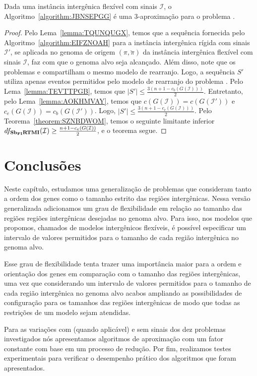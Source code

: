\begin{theorem}\label{theorem:AKZNNSGT}
Dada uma instância intergênica flexível com sinais $\mathcal{I}$, o Algoritmo~\ref{algorithm:JBNSEPGG} é uma $3$-aproximação para o problema \SbFIRTMI{}.
\end{theorem}
\begin{proof}
Pelo Lema~\ref{lemma:TQUNQUGX}, temos que a sequência fornecida pelo Algoritmo~\ref{algorithm:EIFZNOAH} para a instância intergênica rígida com sinais $\mathcal{I'}$, se aplicada no genoma de origem $(\pi,\breve\pi)$ da instância intergênica flexível com sinais $\mathcal{I}$, faz com que o genoma alvo seja alcançado. Além disso, note que os problemas \SbIRTMI{} e \SbFIRTMI{} compartilham o mesmo modelo de rearranjo. Logo, a sequência $S'$ utiliza apenas eventos permitidos pelo modelo de rearranjo do problema \SbFIRTMI{}. Pelo Lema~\ref{lemma:TEVTTPGB}, temos que $|S'| \le \frac{3(n+1 - c_b(G(\mathcal{I})))}{2}$. Entretanto, pelo Lema~\ref{lemma:AOKHMVAY}, temos que $c(G(\mathcal{I})) = c(G(\mathcal{I}'))$ e $c_e(G(\mathcal{I})) = c_b(G(\mathcal{I}'))$. Logo, $|S'| \le \frac{3(n+1 - c_e(G(\mathcal{I})))}{2}$. Pelo Teorema~\ref{theorem:SZNBDWOM}, temos o seguinte limitante inferior $df_{\textbf{Sb\textsubscript{FI}RTMI}}(\mathcal{I}) \ge \frac{n+1 - c_e(G(\mathcal{I}))}{2}$, e o teorema segue.
\end{proof}

\section{Conclusões}

Neste capítulo, estudamos uma generalização de problemas que consideram tanto a ordem dos genes como o tamanho estrito das regiões intergênicas. Nessa versão generalizada adicionamos um grau de flexibilidade em relação ao tamanho das regiões regiões intergênicas desejadas no genoma alvo. Para isso, nos modelos que propomos, chamados de modelos intergênicos flexíveis, é possível especificar um intervalo de valores permitidos para o tamanho de cada região intergênica no genoma alvo. 

Esse grau de flexibilidade tenta trazer uma importância maior para a ordem e orientação dos genes em comparação com o tamanho das regiões intergênicas, uma vez que considerando um intervalo de valores permitidos para o tamanho de cada região intergênica no genoma alvo acabos ampliando as possibilidades de configuração para os tamanhos das regiões intergênicas de modo que todas as restrições de um modelo sejam atendidas.

Para as variações com (quando aplicável) e sem sinais dos dez problemas investigados nós apresentamos algoritmos de aproximação com um fator constante com base em um processo de redução. Por fim, realizamos testes experimentais para verificar o desempenho prático dos algoritmos que foram apresentados.